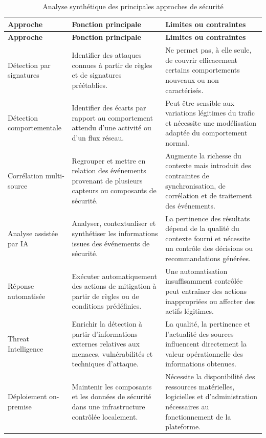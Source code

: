 \renewcommand{\arraystretch}{1.5}
\begin{xltabular}{\textwidth}{|>{\raggedright\arraybackslash}X|>{\raggedright\arraybackslash}X|>{\raggedright\arraybackslash}X|}

\caption{Analyse synthétique des principales approches de sécurité}
\label{tab:analyse_approches_existantes} \\

\hline
{}
\textbf{Approche} & \textbf{Fonction principale} & \textbf{Limites ou contraintes} \\ \hline
\endfirsthead

\hline
{}
\textbf{Approche} & \textbf{Fonction principale} & \textbf{Limites ou contraintes} \\ \hline
\endhead

Détection par signatures &
Identifier des attaques connues à partir de règles et de signatures préétablies. &
Ne permet pas, à elle seule, de couvrir efficacement certains comportements nouveaux ou non caractérisés. \\ \hline

Détection comportementale &
Identifier des écarts par rapport au comportement attendu d'une activité ou d'un flux réseau. &
Peut être sensible aux variations légitimes du trafic et nécessite une modélisation adaptée du comportement normal. \\ \hline

Corrélation multi-source &
Regrouper et mettre en relation des événements provenant de plusieurs capteurs ou composants de sécurité. &
Augmente la richesse du contexte mais introduit des contraintes de synchronisation, de corrélation et de traitement des événements. \\ \hline

Analyse assistée par IA &
Analyser, contextualiser et synthétiser les informations issues des événements de sécurité. &
La pertinence des résultats dépend de la qualité du contexte fourni et nécessite un contrôle des décisions ou recommandations générées. \\ \hline

Réponse automatisée &
Exécuter automatiquement des actions de mitigation à partir de règles ou de conditions prédéfinies. &
Une automatisation insuffisamment contrôlée peut entraîner des actions inappropriées ou affecter des actifs légitimes. \\ \hline

Threat Intelligence &
Enrichir la détection à partir d'informations externes relatives aux menaces, vulnérabilités et techniques d'attaque. &
La qualité, la pertinence et l'actualité des sources influencent directement la valeur opérationnelle des informations obtenues. \\ \hline

Déploiement on-premise &
Maintenir les composants et les données de sécurité dans une infrastructure contrôlée localement. &
Nécessite la disponibilité des ressources matérielles, logicielles et d'administration nécessaires au fonctionnement de la plateforme. \\ \hline

\end{xltabular}
